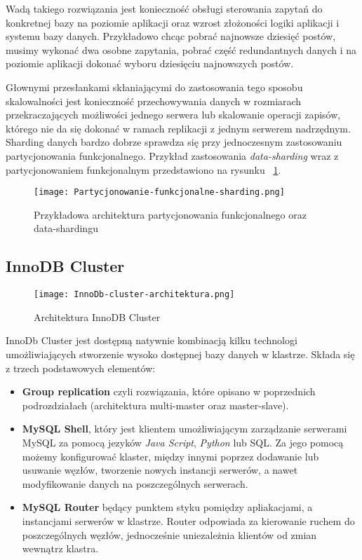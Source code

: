 Wadą takiego rozwiązania jest konieczność obsługi sterowania zapytań do konkretnej bazy na poziomie aplikacji oraz wzrost złożoności logiki aplikacji i systemu bazy danych. Przykładowo chcąc pobrać najnowsze dziesięć postów, musimy wykonać dwa osobne zapytania, pobrać część redundantnych danych i na poziomie aplikacji dokonać wyboru dziesięciu najnowszych postów.


Głownymi przesłankami skłaniającymi do zastosowania tego sposobu skalowalności jest konieczność przechowywania danych w rozmiarach przekraczających możliwości jednego serwera lub skalowanie operacji zapisów, którego nie da się dokonać w ramach replikacji z jednym serwerem nadrzędnym. Sharding danych bardzo dobrze sprawdza się przy jednoczesnym zastosowaniu partycjonowania funkcjonalnego. Przykład zastosowania \textit{data-sharding} wraz z partycjonowaniem funkcjonalnym przedstawiono na rysunku ~\ref{fig:data-sharding}.

\begin{figure}[!h]
	\centering
	\texttt{[image: Partycjonowanie-funkcjonalne-sharding.png]}
	\caption{Przykładowa architektura partycjonowania funkcjonalnego oraz data-shardingu}
	\label{fig:data-sharding}
\end{figure}


\subsection{InnoDB Cluster}

\begin{figure}[!h]
	\centering
	\texttt{[image: InnoDb-cluster-architektura.png]}
	\caption{Architektura InnoDB Cluster}
	\label{fig:label}
\end{figure}
InnoDb Cluster jest dostępną natywnie kombinacją kilku technologi umożliwiających stworzenie wysoko dostępnej bazy danych w klastrze. Składa się z trzech podstawowych elementów:
\begin{itemize}
	\item \textbf{Group replication} czyli rozwiązania, które opisano w poprzednich podrozdziałach (architektura multi-master oraz master-slave).
	\item \textbf{MySQL Shell}, który jest klientem umożliwiającym zarządzanie serwerami MySQL za pomocą jezyków \textit{Java Script}, \textit{Python} lub SQL. Za jego pomocą możemy konfigurować klaster, między innymi poprzez dodawanie lub usuwanie węzłów, tworzenie nowych instancji serwerów, a nawet modyfikowanie danych na poszczególnych serwerach.
	\item \textbf{MySQL Router} będący punktem styku pomiędzy apliakacjami, a instancjami serwerów w klastrze. Router odpowiada za kierowanie ruchem do poszczególnych węzłów, jednocześnie uniezależnia klientów od zmian wewnątrz klastra. 
\end{itemize}

